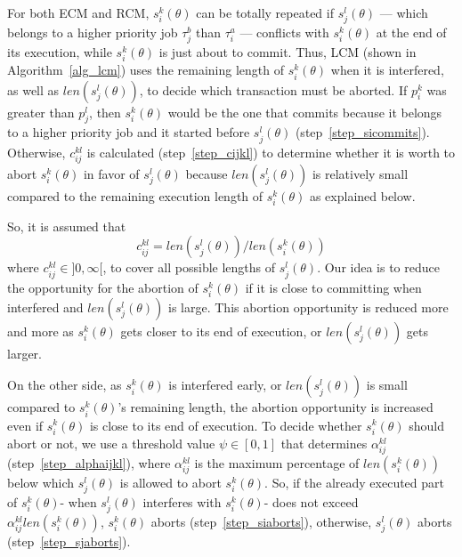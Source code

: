 \documentclass[conference]{sig-alternate}
\begin{document}
For both ECM and RCM, $s_{i}^{k}(\theta)$ can be totally repeated if $s_{j}^{l}(\theta)$ --- which belongs to a higher priority job $\tau_{j}^b$ than $\tau_{i}^a$ --- conflicts with $s_{i}^{k}(\theta)$
at the end of its execution, while $s_{i}^{k}(\theta)$ is just about
to commit. Thus, LCM (shown in Algorithm~\ref{alg_lcm}) uses the remaining length of $s_{i}^{k}(\theta)$ when it is interfered,
as well as $len(s_{j}^{l}(\theta))$, to decide which transaction must be aborted. If $p_i^k$ was greater than $p_j^l$, then $s_i^k(\theta)$ would be the one that commits because it belongs to a higher priority job and it started before $s_j^l(\theta)$ (step~\ref{step_sicommits}). Otherwise, $c_{ij}^{kl}$ is calculated (step~\ref{step_cijkl}) to determine whether it is worth to abort $s_i^k(\theta)$ in favor of $s_j^l(\theta)$ because $len(s_j^l(\theta))$ is relatively small compared to the remaining execution length of $s_i^k(\theta)$ as explained below.

So, it is assumed that 
\begin{equation}
c_{ij}^{kl}=len(s_{j}^{l}(\theta))/len(s_{i}^{k}(\theta))
\label{cm_eq}\end{equation}
where $c_{ij}^{kl}\in]0,\infty[$, to cover all possible lengths of $s_{j}^{l}(\theta)$.
Our idea is to reduce the opportunity for the abortion of $s_{i}^{k}(\theta)$ if it is close to committing when interfered and $len(s_{j}^{l}(\theta))$ is large. This abortion opportunity is reduced more and more as $s_{i}^{k}(\theta)$ gets closer to its end of execution, or $len(s_{j}^{l}(\theta))$ gets larger. 

On the other side, as $s_{i}^{k}(\theta)$ is interfered early,
or $len(s_{j}^{l}(\theta))$ is small compared to $s_{i}^{k}(\theta)$'s remaining length, the abortion opportunity 
is increased even if $s_i^k (\theta)$ is close to its end of execution. To decide whether $s_{i}^{k}(\theta)$ should abort or not, we use a threshold value $\psi\in[0,1]$ that determines $\alpha_{ij}^{kl}$ (step~\ref{step_alphaijkl}), where $\alpha_{ij}^{kl}$ is the maximum percentage of $len(s_i^k(\theta))$ below which $s_j^l(\theta)$ is allowed to abort $s_i^k(\theta)$. So, if the already executed part of $s_i^k(\theta)$- when $s_j^l(\theta)$ interferes with $s_i^k(\theta)$- does not exceed $\alpha_{ij}^{kl}len(s_i^k(\theta))$, $s_i^k(\theta)$ aborts (step~\ref{step_siaborts}), otherwise, $s_j^l(\theta)$ aborts (step~\ref{step_sjaborts}).
\end{document}
